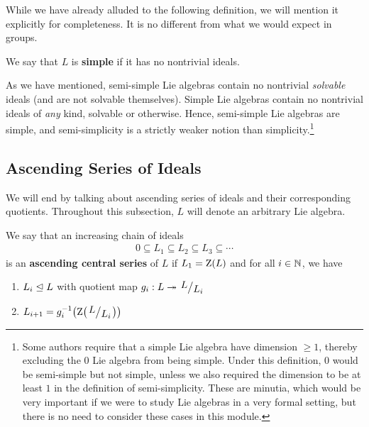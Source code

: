 While we have already alluded to the following definition, we will mention it explicitly for completeness. It is no different from what we would expect in groups.

\begin{boxdefinition}[Simplicity]
    We say that $L$ is \textbf{simple} if it has no nontrivial ideals.
\end{boxdefinition}

As we have mentioned, semi-simple Lie algebras contain no nontrivial \textit{solvable} ideals (and are not solvable themselves). Simple Lie algebras contain no nontrivial ideals of \textit{any} kind, solvable or otherwise. Hence, semi-simple Lie algebras are simple, and semi-simplicity is a strictly weaker notion than simplicity.\footnote{Some authors require that a simple Lie algebra have dimension $\geq 1$, thereby excluding the $0$ Lie algebra from being simple. Under this definition, $0$ would be semi-simple but not simple, unless we also required the dimension to be at least $1$ in the definition of semi-simplicity. These are minutia, which would be very important if we were to study Lie algebras in a very formal setting, but there is no need to consider these cases in this module.}

\subsection{Ascending Series of Ideals}

We will end by talking about ascending series of ideals and their corresponding quotients. Throughout this subsection, $L$ will denote an arbitrary Lie algebra.

\begin{boxdefinition}
    We say that an increasing chain of ideals
    \begin{align*}
        0 \subseteq L_1 \subseteq L_2 \subseteq L_3 \subseteq \cdots
    \end{align*}
    is an \textbf{ascending central series} of $L$ if $L_1 = \operatorname{Z}\!\left( L \right)$ and for all $i \in \mathbb{N}$, we have
    \begin{enumerate}
        \item $L_i \trianglelefteq L$ with quotient map $g_i : L \surj \quotient{L}{L_i}$
        \item $L_{i + 1} = g_i\inv\!\parenth{\Zof{\quotient{L}{L_i}}}$
    \end{enumerate}
\end{boxdefinition}

